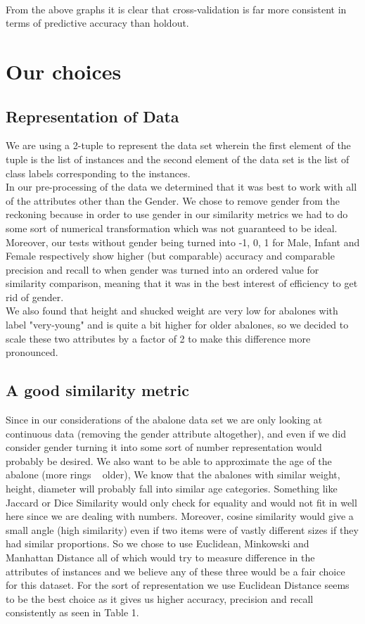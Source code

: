 \\ 

From the above graphs it is clear that cross-validation is far more consistent in terms of predictive accuracy than holdout. 



\section{Our choices}

\subsection{Representation of Data}

We are using a 2-tuple to represent the data set wherein the first element of the tuple is the list of instances and the second element of the data set is the list of class labels corresponding to the instances. \\
In our pre-processing of the data we determined that it was best to work with all of the attributes other than the Gender. We chose to remove gender from the reckoning because in order to use gender in our similarity metrics we had to do some sort of numerical transformation which was not guaranteed to be ideal. Moreover, our tests without gender being turned into -1, 0, 1 for Male, Infant and Female respectively show higher (but comparable) accuracy and comparable precision and recall to when gender was turned into an ordered value for similarity comparison, meaning that it was in the best interest of efficiency to get rid of gender.  \\
We also found that height and shucked weight are very low for abalones with label "very-young" and is quite a bit higher for older abalones, so we decided to scale these two attributes by a factor of 2 to make this difference more pronounced. 

\subsection{A good similarity metric}

Since in our considerations of the abalone data set we are only looking at continuous data (removing the gender attribute altogether), and even if we did consider gender turning it into some sort of number representation would probably be desired. We also want to be able to approximate the age of the abalone (more rings ~ older), We know that the abalones with similar weight, height, diameter will probably fall into similar age categories. Something like Jaccard or Dice Similarity would only check for equality and would not fit in well here since we are dealing with numbers. Moreover, cosine similarity would give a small angle (high similarity) even if two items were of vastly different sizes if they had similar proportions. So we chose to use Euclidean, Minkowski and Manhattan Distance all of which would try to measure difference in the attributes of instances and we believe any of these three would be a fair choice for this dataset. For the sort of representation we use Euclidean Distance seems to be the best choice as it gives us higher accuracy, precision and recall consistently as seen in Table 1. 

